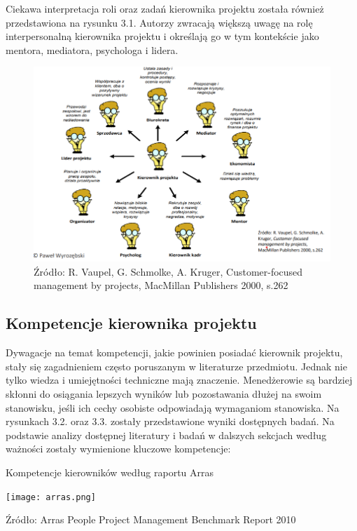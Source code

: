 Ciekawa interpretacja roli oraz zadań kierownika projektu została również przedstawiona na rysunku 3.1. Autorzy zwracają większą uwagę na rolę interpersonalną kierownika projektu i określają go w tym kontekście jako mentora, mediatora, psychologa i lidera.
\begin{figure}
\centering
\includegraphics[width=14cm]{img/rola.png}
\caption{Źródło: R. Vaupel, G. Schmolke, A. Kruger, Customer-focused management by projects, MacMillan Publishers 2000, s.262}
\end{figure}

\subsection{Kompetencje kierownika projektu}
Dywagacje na temat kompetencji, jakie powinien posiadać kierownik projektu, stały się zagadnieniem często poruszanym w literaturze przedmiotu. Jednak nie tylko wiedza i umiejętności techniczne mają znaczenie. Menedżerowie są bardziej skłonni do osiągania lepszych wyników lub pozostawania dłużej na swoim stanowisku, jeśli ich cechy osobiste odpowiadają wymaganiom stanowiska.\autocite{MUMFORD200011}
Na rysunkach 3.2. oraz 3.3. zostały przedstawione wyniki dostępnych badań.
Na podstawie analizy dostępnej literatury i badań w dalszych sekcjach według ważności zostały wymienione kluczowe kompetencje: \autocite{analizaMulti} \autocite{Alvarenga} \autocite{arras2010} \autocite{ziek} \autocite{brill} \autocite{arras2015}

\begin{table}
    \caption{Kompetencje kierowników według raportu Arras}
    \centering
    \label{tbl:excel-table}
    \texttt{[image: arras.png]}
    \caption*{Źródło: Arras People Project Management Benchmark Report 2010 }
  \end{table}


